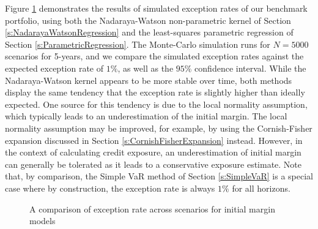 \documentclass[preprint,12pt]{elsarticle}
\begin{document}
Figure \ref{fig:ExceptionAcrossScenarios} demonstrates the results of simulated exception rates of our benchmark portfolio, using both the Nadaraya-Watson non-parametric kernel of Section \ref{s:NadarayaWatsonRegression} and the least-squares parametric regression of Section \ref{s:ParametricRegression}. The Monte-Carlo simulation runs for $N=5000$ scenarios for 5-years, and we compare the simulated exception rates against the expected exception rate of $1\%$, as well as the $95\%$ confidence interval. While the Nadaraya-Watson kernel appears to be more stable over time, both methods display the same tendency that the exception rate is slightly higher than ideally expected. One source for this tendency is due to the local normality assumption, which typically leads to an underestimation of the initial margin. The local normality assumption may be improved, for example, by using the Cornish-Fisher expansion discussed in Section \ref{s:CornishFisherExpansion} instead. However, in the context of calculating credit exposure, an underestimation of initial margin can generally be tolerated as it leads to a conservative exposure estimate. Note that, by comparison, the Simple VaR method of Section \ref{s:SimpleVaR} is a special case where by construction, the exception rate is always $1\%$ for all horizons.

\begin{figure}[h] 
\hfill
{}
\hfill
{}
\hfill
\caption{A comparison of exception rate across scenarios for initial margin models}
\label{fig:ExceptionAcrossScenarios}
\end{figure}
\end{document}
